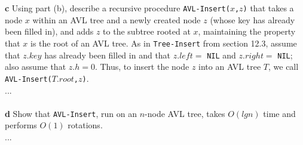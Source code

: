 \documentclass[11pt,english]{article}
\begin{document}
\\\\
\noindent \large{\textbf{c} \mdseries Using part (b), describe a recursive
procedure \texttt{AVL-Insert($x$,$z$)} that takes a node $x$ within an AVL
tree and a newly created node $z$ (whose key has already been filled in), and
adds $z$ to the subtree rooted at $x$, maintaining the property that $x$ is
the root of an AVL tree. As in \texttt{Tree-Insert} from section 12.3, assume
that $z.key$ has already been filled in and that $z.left =$ \texttt{NIL} and
$z.right =$ \texttt{NIL}; also assume that $z.h = 0$. Thus, to insert the node
$z$ into an AVL tree $T$, we call \texttt{AVL-Insert($T.root$,$z$)}.}
\\
...
\\\\
\noindent \large{\textbf{d} \mdseries Show that \texttt{AVL-Insert}, run on an
$n$-node AVL tree, takes $O(lg n)$ time and performs $O(1)$ rotations.}
\\
...








\end{document}

